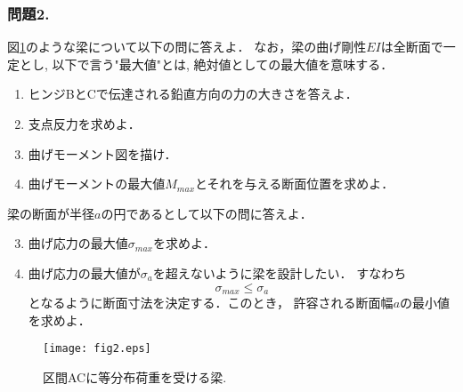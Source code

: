 \documentclass[10pt,a4j]{jarticle}
\begin{document}
\subsubsection*{問題2.}
図\ref{fig:fig2}のような梁について以下の問に答えよ．
なお，梁の曲げ剛性$EI$は全断面で一定とし, 以下で言う"最大値"とは, 
絶対値としての最大値を意味する．
\begin{enumerate}
\item
	ヒンジBとCで伝達される鉛直方向の力の大きさを答えよ．
\item
	支点反力を求めよ．
\item
	曲げモーメント図を描け．
\item
	曲げモーメントの最大値$M_{max}$とそれを与える断面位置を求めよ．
\end{enumerate}
梁の断面が半径$a$の円であるとして以下の問に答えよ．
\begin{enumerate}
\setcounter{enumi}{2}
\item
	曲げ応力の最大値$\sigma_{max}$を求めよ．
\item
	曲げ応力の最大値が$\sigma_a$を超えないように梁を設計したい．
	すなわち
	\[
		\sigma_{max} \leq \sigma_a
	\]
	となるように断面寸法を決定する．このとき，
	許容される断面幅$a$の最小値を求めよ．
\end{enumerate}
\begin{figure}[h]
	\begin{center}
	\texttt{[image: fig2.eps]} 
	\end{center}
	\caption{区間ACに等分布荷重を受ける梁.} 
	\label{fig:fig2}
\end{figure}
\end{document}
